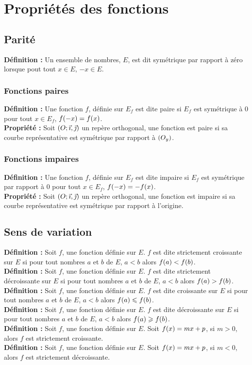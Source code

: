 \documentclass[a4paper,titlepage]{article}
\let\oldsection\section
\renewcommand\section{\clearpage\oldsection}
\let\oldleft\left
\renewcommand{\left}{\mathopen{}\mathclose\bgroup\oldleft}
\let\oldright\right
\renewcommand{\right}{\aftergroup\egroup\oldright}
\begin{document}
\section{Propriétés des fonctions}
    \subsection{Parité}
        \textbf{Définition :} Un ensemble de nombres, $E$, est dit symétrique par rapport à zéro lorsque pout tout $x\in E$, $-x\in E$.
    \subsubsection{Fonctions paires}
        \textbf{Définition :} Une fonction $f$, définie sur $E_{f}$ est dite paire si $E_{f}$ est symétrique à $0$ pour tout $x\in E_{f}$, $f\left(-x\right)=f\left(x\right)$.
        \\
        \textbf{Propriété :} Soit $\left(O;\vec{\imath},\vec{\jmath}\right)$ un repère orthogonal, une fonction est paire si sa courbe représentative est symétrique par rapport à $\left(O_{y}\right)$.
    \subsubsection{Fonctions impaires}
        \textbf{Définition :} Une fonction $f$, définie sur $E_{f}$ est dite impaire si $E_{f}$ est symétrique par rapport à $0$ pour tout $x\in E_{f}$, $f\left(-x\right)=-f\left(x\right)$.
        \\
        \textbf{Propriété :} Soit $\left(O;\vec{\imath},\vec{\jmath}\right)$ un repère orthogonal, une fonction est impaire si sa courbe représentative est symétrique par rapport à l’origine.
    \subsection{Sens de variation}
        \textbf{Définition :} Soit $f$, une fonction définie sur $E$. $f$ est dite strictement croissante sur $E$ si pour tout nombres $a$ et $b$ de $E$, $a<b$ alors $f\left(a\right)<f\left(b\right)$.
        \\
        \textbf{Définition :} Soit $f$, une fonction définie sur $E$. $f$ est dite strictement dé\-crois\-sante sur $E$ si pour tout nombres $a$ et $b$ de $E$, $a<b$ alors $f\left(a\right)>f\left(b\right)$.
        \\
        \textbf{Définition :} Soit $f$, une fonction définie sur $E$. $f$ est dite croissante sur $E$ si pour tout nombres $a$ et $b$ de $E$, $a<b$ alors $f\left(a\right)\leqslant f\left(b\right)$.
        \\
        \textbf{Définition :} Soit $f$, une fonction définie sur $E$. $f$ est dite décroissante sur $E$ si pour tout nombres $a$ et $b$ de $E$, $a<b$ alors $f\left(a\right)\geqslant f\left(b\right)$.
        \\
        \textbf{Définition :} Soit $f$, une fonction définie sur $E$. Soit $f\left(x\right)=mx+p$, si $m>0$, alors $f$ est strictement croissante.
        \\
        \textbf{Définition :} Soit $f$, une fonction définie sur $E$. Soit $f\left(x\right)=mx+p$, si $m<0$, alors $f$ est strictement décroissante.
\end{document}
